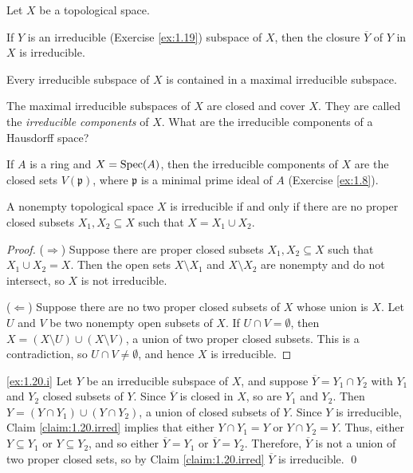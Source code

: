 \begin{exercise}
\label{ex:1.20}
Let $X$ be a topological space.
\begin{rlist}
\item
\label{ex:1.20.i}
If $Y$ is an irreducible (Exercise \ref{ex:1.19}) subspace of $X$, then the closure $\overline Y$ of $Y$ in $X$ is irreducible.
\item
\label{ex:1.20.ii}
Every irreducible subspace of $X$ is contained in a maximal irreducible subspace.
\item
\label{ex:1.20.iii}
The maximal irreducible subspaces of $X$ are closed and cover $X$.
They are called the \emph{irreducible components} of $X$.
What are the irreducible components of a Hausdorff space?
\item
\label{ex:1.20.iv}
If $A$ is a ring and $X = \operatorname{Spec}(A)$, then the irreducible components of $X$ are the closed sets $V(\mathfrak p)$, where $\mathfrak p$ is a minimal prime ideal of $A$ (Exercise \ref{ex:1.8}).
\end{rlist}
\end{exercise}

\begin{claim}
\label{claim:1.20.irred}
A nonempty topological space $X$ is irreducible if and only if there are no proper closed subsets $X_1,X_2\subseteq X$ such that $X = X_1 \cup X_2$.
\end{claim}

\begin{proof}
($\Rightarrow$)
Suppose there are proper closed subsets $X_1,X_2\subseteq X$ such that $X_1 \cup X_2 = X$.
Then the open sets $X\setminus X_1$ and $X\setminus X_2$ are nonempty and do not intersect, so $X$ is not irreducible.

($\Leftarrow$)
Suppose there are no two proper closed subsets of $X$ whose union is $X$.
Let $U$ and $V$ be two nonempty open subsets of $X$.
If $U\cap V = \emptyset$, then $X = (X\setminus U) \cup (X\setminus V)$, a union of two proper closed subsets.
This is a contradiction, so $U\cap V \neq \emptyset$, and hence $X$ is irreducible.
\end{proof}

\noindent
\ref{ex:1.20.i}
Let $Y$ be an irreducible subspace of $X$, and suppose $\overline Y = Y_1 \cap Y_2$ with $Y_1$ and $Y_2$ closed subsets of $Y$.
Since $\overline Y$ is closed in $X$, so are $Y_1$ and $Y_2$.
Then $Y = (Y \cap Y_1) \cup (Y \cap Y_2)$, a union of closed subsets of $Y$.
Since $Y$ is irreducible, Claim \ref{claim:1.20.irred} implies that either $Y\cap Y_1 = Y$ or $Y \cap Y_2 = Y$.
Thus, either $Y \subseteq Y_1$ or $Y \subseteq Y_2$, and so either $\overline Y = Y_1$ or $\overline Y = Y_2$.
Therefore, $\overline Y$ is not a union of two proper closed sets, so by Claim \ref{claim:1.20.irred} $\overline Y$ is irreducible.
\qed

